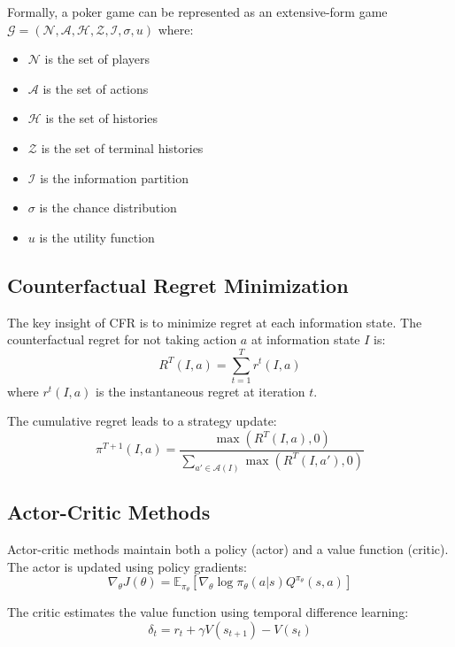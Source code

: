 \documentclass[10pt,twocolumn,conference]{IEEEtran}
\begin{document}
Formally, a poker game can be represented as an extensive-form game $\mathcal{G} = (\mathcal{N}, \mathcal{A}, \mathcal{H}, \mathcal{Z}, \mathcal{I}, \sigma, u)$ where:
\begin{itemize}
    \item $\mathcal{N}$ is the set of players
    \item $\mathcal{A}$ is the set of actions
    \item $\mathcal{H}$ is the set of histories
    \item $\mathcal{Z}$ is the set of terminal histories
    \item $\mathcal{I}$ is the information partition
    \item $\sigma$ is the chance distribution
    \item $u$ is the utility function
\end{itemize}

\subsection{Counterfactual Regret Minimization}
The key insight of CFR is to minimize regret at each information state. The counterfactual regret for not taking action $a$ at information state $I$ is:
\begin{equation}
R^T(I,a) = \sum_{t=1}^{T} r^t(I,a)
\end{equation}
where $r^t(I,a)$ is the instantaneous regret at iteration $t$.

The cumulative regret leads to a strategy update:
\begin{equation}
\pi^{T+1}(I,a) = \frac{\max(R^T(I,a), 0)}{\sum_{a' \in \mathcal{A}(I)} \max(R^T(I,a'), 0)}
\end{equation}

\subsection{Actor-Critic Methods}
Actor-critic methods maintain both a policy (actor) and a value function (critic). The actor is updated using policy gradients:
\begin{equation}
\nabla_\theta J(\theta) = \mathbb{E}_{\pi_\theta}[\nabla_\theta \log \pi_\theta(a|s) Q^{\pi_\theta}(s,a)]
\end{equation}

The critic estimates the value function using temporal difference learning:
\begin{equation}
\delta_t = r_t + \gamma V(s_{t+1}) - V(s_t)
\end{equation}
\end{document}
